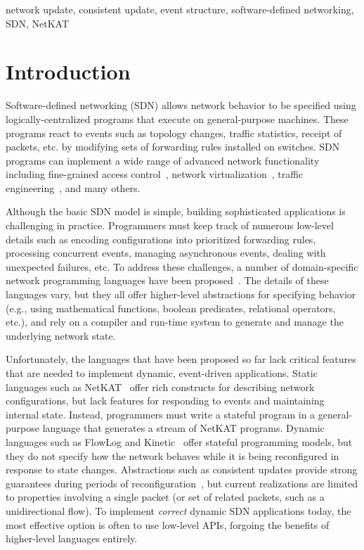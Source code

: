 \documentclass[pldi-cameraready]{sigplanconf}
\begin{document}
\keywords
network update, consistent update, event structure, software-defined networking, SDN, NetKAT




\section{Introduction}
\label{sec:introduction}

Software-defined networking (SDN) allows network behavior to be
specified using logically-centralized programs that execute on
general-purpose machines. These programs react to events such as
topology changes, traffic statistics, receipt of packets, etc. by modifying sets of forwarding rules installed on
switches. SDN programs can implement a wide range of advanced network
functionality including fine-grained access
control~\cite{ethane-sigcomm07}, network
virtualization~\cite{koponen2014network}, traffic
engineering~\cite{b4-sigcomm13,swan-sigcomm13}, and many others.

Although the basic SDN model is simple, building sophisticated
applications is challenging in practice. Programmers must keep track
of numerous low-level details such as encoding configurations into
prioritized forwarding rules, processing concurrent events, managing
asynchronous events, dealing with unexpected failures, etc. To address
these challenges, a number of domain-specific network programming
languages have been
proposed~\cite{anderson2014netkat,nelson2014tierless,foster2011frenetic,voellmy2013maple,soule2014merlin,kang2013optimizing,moshref2013scalable,kim2015kinetic}.
The details of these languages vary, but they all offer higher-level
abstractions for specifying behavior (e.g., using mathematical
functions, boolean predicates, relational operators, etc.), and rely
on a compiler and run-time system to generate and manage the
underlying network state.

Unfortunately, the languages that have been proposed so far lack
critical features that are needed to implement dynamic, event-driven
applications.  Static languages such as
NetKAT~\cite{anderson2014netkat} offer rich constructs for describing
network configurations, but lack features for responding to events and
maintaining internal state. Instead, programmers must write a stateful
program in a general-purpose language that generates a stream of
NetKAT programs. Dynamic languages such as FlowLog and
Kinetic~\cite{nelson2014tierless,kim2015kinetic} offer stateful
programming models, but they do not specify how the network behaves
while it is being reconfigured in response to state
changes. Abstractions such as consistent updates provide strong
guarantees during periods of
reconfiguration~\cite{reitblatt2012abstractions,mcclurg2015efficient},
but current realizations are limited to properties involving a single
packet (or set of related packets, such as a unidirectional flow). To
implement {\em correct} dynamic SDN applications today, the most effective option is
often to use low-level APIs, forgoing the benefits of
higher-level languages entirely.
\end{document}
